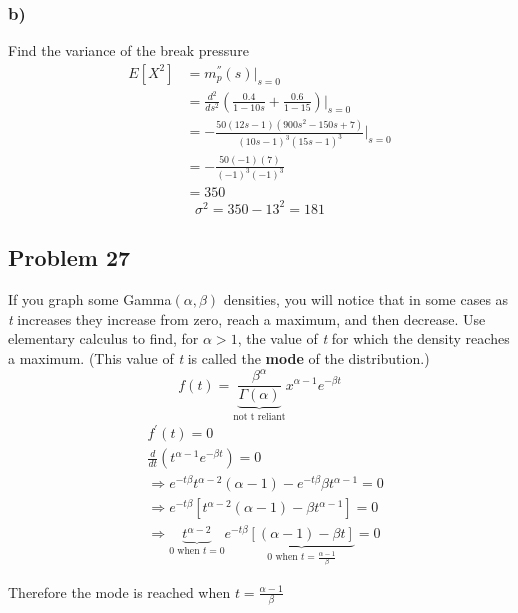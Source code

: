 \documentclass{article}
\begin{document}
\subsubsection*{b)}
Find the variance of the break pressure   
\begin{align}
    E[X^2] &= m^{''}_p(s)\bigg|_{s=0} \\
    &= \frac{d^2}{ds^2}\left(\frac{0.4}{1 -1 0s} + \frac{0.6}{1-15}\right)\bigg|_{s=0} \\
    &= -\frac{50\left(12s-1\right)\left(900s^2-150s+7\right)}{\left(10s-1\right)^3\left(15s-1\right)^3}\bigg|_{s=0}\\
    &= -\frac{50\left(-1\right)\left(7\right)}{\left(-1\right)^3\left(-1\right)^3}\\
    &= 350
\end{align}
\begin{equation}
    \sigma^2 = 350 - 13^2 = \boxed{181}
\end{equation}
\newpage
\subsection*{Problem 27}
If you graph some Gamma$(\alpha, \beta)$ densities, you will notice that in some cases as \textit{t} increases they increase from zero, reach a maximum, and then decrease. Use elementary calculus to find, for $\alpha > 1$, the value of \textit{t} for which the density reaches a maximum. (This value of \textit{t} is called the \textbf{mode} of the distribution.)
\begin{equation}
    f(t) = \underbrace{\frac{\beta^\alpha}{\Gamma(\alpha)}}_{\text{not t reliant}}x^{\alpha-1}e^{-\beta t}
\end{equation}
\begin{align}
    & f^{'}(t) =0\\
    & \frac{d}{dt}(t^{\alpha-1}e^{-\beta t}) =0\\
    &\Rightarrow e^{-t\beta}t^{\alpha-2}\left(\alpha-1\right)-e^{-t\beta}\beta t^{\alpha-1} = 0\\
    &\Rightarrow e^{-t\beta}[t^{\alpha-2}\left(\alpha-1\right)-\beta t^{\alpha-1}] = 0\\
    &\Rightarrow \underbrace{t^{\alpha-2}}_{0\text{ when }t = 0 }e^{-t\beta}\underbrace{[\left(\alpha-1\right)-\beta t]}_{0\text{ when }t = \frac{\alpha - 1}{\beta}} = 0
\end{align}
\begin{center}
    Therefore the mode is reached when $t = \frac{\alpha - 1}{\beta}$
\end{center}
\end{document}
